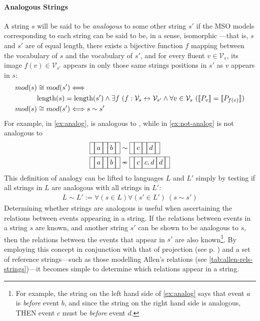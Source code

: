 \documentclass[a4paper,12pt,leqno]{article}
\newcommand{\vph}[1]{\vphantom{#1}}
\newcommand{\ebox}[1]{\fbox{$\vph{'(),}#1$}}
\newcommand{\nbBefore}[2]{\ebox{#1}\ebox{}\ebox{#2}}
\newcommand{\nbOverlaps}[2]{\ebox{#1}\ebox{#1,#2}\ebox{#2}}
\newcommand{\Before}[2]{\ebox{}\nbBefore{#1}{#2}\ebox{}}
\newcommand{\Overlaps}[2]{\ebox{}\nbOverlaps{#1}{#2}\ebox{}}
\newcommand{\V}{\mathcal{V}}
\newcommand{\nb}[1]{{\color{red}[NB\footnote{{\color{red}#1}}]}}
\begin{document}
\paragraph{Analogous Strings}\label{para:analogous-strings}
A string $s$ will be said to be \textit{analogous} to some other string $s'$ if the MSO models corresponding to each string can be said to be, in a sense, isomorphic%
---that is, $s$ and $s'$ are of equal length, there exists a bijective function $f$ mapping between the vocabulary of $s$ and the vocabulary of $s'$, and for every fluent $v \in \V_s$, its image $f(v) \in \V_{s'}$ appears in only those same strings positions in $s'$ as $v$ appears in $s$:
\begin{align}
	mod(s) &\cong mod(s') \Longleftrightarrow \\\notag &\text{length}(s) = \text{length}(s') \land \exists f ~(f: \V_s \leftrightarrow \V_{s'} \land \forall v \in \V_s ~(\llbracket P_v \rrbracket = \llbracket P_{f(v)} \rrbracket)\\
	mod(s) &\cong mod(s') \Longleftrightarrow s \sim s'
\end{align}
For example, in \cref{ex:analog}, \Before{a}{b} is analogous to \Before{c}{d}, while in \cref{ex:not-analog} \Before{a}{b} is not analogous to \Overlaps{c}{d}
\begin{align}
	\Before{a}{b} &\sim \Before{c}{d}\label{ex:analog}\\
	\Before{a}{b} &\nsim \Overlaps{c}{d}\label{ex:not-analog}
\end{align}
This definition of analogy can be lifted to languages $L$ and $L'$ simply by testing if all strings in $L$ are analogous with all strings in $L'$:
\begin{align}
	L \sim L' := \forall (s \in L) \forall (s' \in L')~ (s \sim s')
\end{align}
Determining whether strings are analogous is useful when ascertaining the relations between events appearing in a string. If the relations between events in a string $s$ are known, and another string $s'$ can be shown to be analogous to $s$, then the relations between the events that appear in $s'$ are also known\footnote{For example, the string on the left hand side of \cref{ex:analog} says that event $a$ is \textit{before} event $b$, and since the string on the right hand side is analogous, THEN event $c$ must be \textit{before} event $d$.}. By employing this concept in conjunction with that of projection (see p. \pageref{para:str-op-projection}) and a set of reference strings---such as those modelling Allen's relations (see \cref{tab:allen-rels-strings})---it becomes simple to determine which relations appear in a string.
\end{document}
